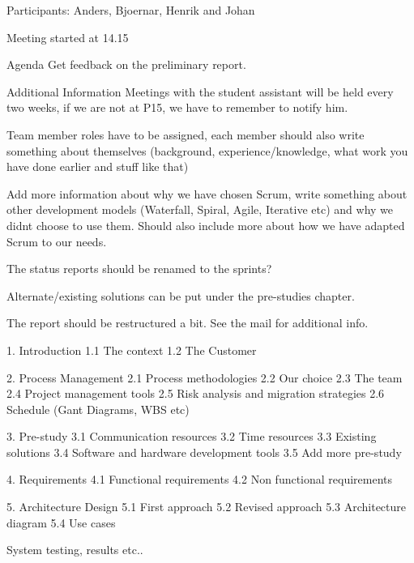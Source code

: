 Participants: Anders, Bjoernar, Henrik and Johan

Meeting started at 14.15

Agenda
Get feedback on the preliminary report.

Additional Information
Meetings with the student assistant will be held every two weeks, if we are not at P15, we have to remember to notify him. 


Team member roles have to be assigned, each member should also write something about themselves (background, experience/knowledge, what work you have done earlier and stuff like that)


Add more information about why we have chosen Scrum, write something about other development models (Waterfall, Spiral, Agile, Iterative etc) and why we didnt choose to use them. Should also include more about how we have adapted Scrum to our needs.


The status reports should be renamed to the sprints?

Alternate/existing solutions can be put under the pre-studies chapter.


The report should be restructured a bit. See the mail for additional info.


1. Introduction
1.1 The context
1.2 The Customer

2. Process Management
2.1 Process methodologies
2.2 Our choice
2.3 The team
2.4 Project management tools
2.5 Risk analysis and migration strategies
2.6 Schedule (Gant Diagrams, WBS etc)


3. Pre-study
3.1 Communication resources
3.2 Time resources
3.3 Existing solutions
3.4 Software and hardware development tools
3.5 Add more pre-study

4. Requirements
4.1 Functional requirements
4.2 Non functional requirements

5. Architecture Design
5.1 First approach
5.2 Revised approach
5.3 Architecture diagram
5.4 Use cases

System testing, results etc..